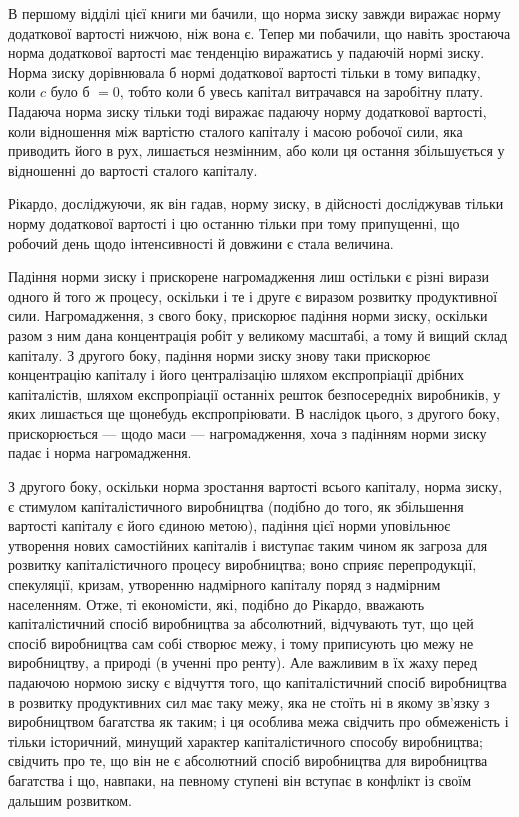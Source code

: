 


В першому відділі цієї книги ми бачили, що норма зиску завжди виражає норму додаткової вартості
нижчою, ніж вона є. Тепер ми побачили, що навіть зростаюча норма додаткової вартості має тенденцію
виражатись у падаючій нормі зиску. Норма
зиску дорівнювала б нормі додаткової вартості тільки в тому випадку, коли $c$ було б $= 0$, тобто коли б
увесь капітал витрачався на заробітну плату. Падаюча норма зиску тільки тоді виражає падаючу норму
додаткової вартості, коли відношення між вартістю сталого капіталу і масою робочої сили, яка
приводить його в рух, лишається незмінним, або коли ця остання збільшується у відношенні до вартості
сталого капіталу.

Рікардо, досліджуючи, як він гадав, норму зиску, в дійсності досліджував тільки норму додаткової
вартості і цю останню тільки при тому припущенні, що робочий день щодо інтенсивності й довжини є
стала величина.

Падіння норми зиску і прискорене нагромадження лиш остільки є різні вирази одного й того ж процесу,
оскільки і те і друге є виразом розвитку продуктивної сили. Нагромадження, з свого боку, прискорює
падіння норми зиску, оскільки разом з ним
дана концентрація робіт у великому масштабі, а тому й вищий склад капіталу. З другого боку, падіння
норми зиску знову таки прискорює концентрацію капіталу і його централізацію шляхом експропріації
дрібних капіталістів, шляхом експропріації
останніх решток безпосередніх виробників, у яких лишається ще щонебудь експропріювати. В наслідок
цього, з другого боку, прискорюється — щодо маси — нагромадження, хоча з падінням норми зиску падає
і норма нагромадження.

З другого боку, оскільки норма зростання вартості всього капіталу, норма зиску, є стимулом
капіталістичного виробництва (подібно до того, як збільшення вартості капіталу є його єдиною метою),
падіння цієї норми уповільнює утворення нових самостійних капіталів і виступає таким чином як
загроза для розвитку капіталістичного процесу виробництва; воно сприяє перепродукції, спекуляції,
кризам, утворенню надмірного капіталу поряд з надмірним населенням. Отже, ті економісти, які,
подібно до Рікардо, вважають капіталістичний спосіб виробництва за абсолютний, відчувають тут, що
цей спосіб виробництва сам собі створює межу, і тому приписують цю межу не виробництву, а природі (в
ученні про ренту). Але важливим в їх жаху перед падаючою нормою зиску є відчуття того, що
капіталістичний спосіб виробництва в розвитку продуктивних сил має таку межу, яка не стоїть ні в
якому зв’язку з виробництвом багатства як таким;
і ця особлива межа свідчить про обмеженість і тільки
історичний, минущий характер капіталістичного способу виробництва;
свідчить про те, що він не є абсолютний спосіб виробництва
для виробництва багатства і що, навпаки, на певному
ступені він вступає в конфлікт із своїм дальшим розвитком.

